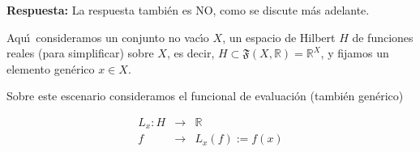 \textbf{Respuesta:}
La respuesta tambi\'en es NO, como se discute m\'as adelante.


Aqu\'\i\ consideramos un conjunto no vac\'\i o $X$, un espacio de
Hilbert $H$ de funciones reales (para simplificar) sobre $X$,
es decir, $H\subset\mathfrak{F}(X,\mathbb{R})=\mathbb{R}^X$,
y fijamos un elemento gen\'erico $x\in X$.

\smallskip
Sobre este escenario consideramos el funcional de evaluaci\'on
(tambi\'en gen\'erico)

\begin{eqnarray*}
L_x: H &\rightarrow &\mathbb{R} \\
 f &\rightarrow & L_x(f):= f(x)
\end{eqnarray*}


